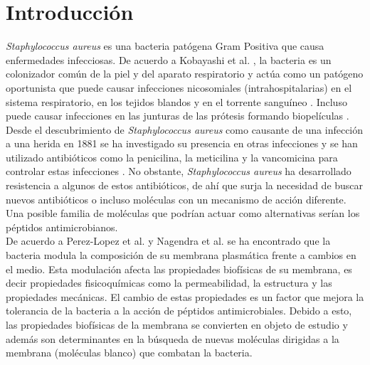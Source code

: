 \chapter{Introducci\'{o}n}
\textit{Staphylococcus aureus} es una bacteria pat\'{o}gena Gram Positiva que causa enfermedades infecciosas. De acuerdo a Kobayashi et al. \cite{Kobayashi2015PathogenesisAbscesses}, la bacteria es un colonizador com\'{u}n de la piel y del aparato respiratorio y act\'{u}a como un pat\'{o}geno oportunista que puede causar infecciones nicosomiales (intrahospitalarias) en el sistema respiratorio, en los tejidos blandos y en el torrente sangu\'ineo \cite{HarpavatS.NissimS.LipppincottsMicrocards:MicrobiologyFlashCards2012.}. Incluso puede causar infecciones en las junturas de las pr\'otesis formando biopel\'iculas \cite{Meylan2018}.\\



Desde el descubrimiento de \textit{Staphylococcus aureus} como causante de una infecci\'on a una herida en 1881 \cite{Orent2006AMagazine} se ha investigado su presencia en otras infecciones y se han utilizado antibi\'oticos como la penicilina, la meticilina y la vancomicina para controlar estas infecciones   \cite{HarpavatS.NissimS.LipppincottsMicrocards:MicrobiologyFlashCards2012.}. No obstante, \textit{Staphylococcus aureus} ha desarrollado resistencia a algunos de estos antibi\'oticos,  de ah\'{i} que surja la necesidad de buscar nuevos antibi\'oticos o incluso mol\'{e}culas con un mecanismo de acci\'{o}n diferente. Una posible familia de mol\'{e}culas que podr\'{i}an actuar como alternativas ser\'{i}an los p\'{e}ptidos antimicrobianos.\\

De acuerdo a Perez-Lopez et al. \cite{Perez-LopezVariationsProperties} y Nagendra et al.  \cite{Nagendra2011} se ha encontrado que la bacteria modula la composici\'{o}n de su membrana plasm\'{a}tica frente a cambios en el medio. Esta modulaci\'{o}n afecta las propiedades biof\'{i}sicas de su membrana, es decir propiedades fisicoqu\'{i}micas como la permeabilidad, la estructura y las propiedades mec\'{a}nicas. El cambio de estas propiedades es un factor que mejora la tolerancia de la bacteria a la acci\'{o}n de p\'{e}ptidos antimicrobiales. Debido a esto, las propiedades biof\'{i}sicas de la membrana se convierten en objeto de estudio y adem\'{a}s son determinantes en la b\'{u}squeda de nuevas mol\'{e}culas dirigidas a la membrana (mol\'{e}culas blanco) que combatan la bacteria. \\

